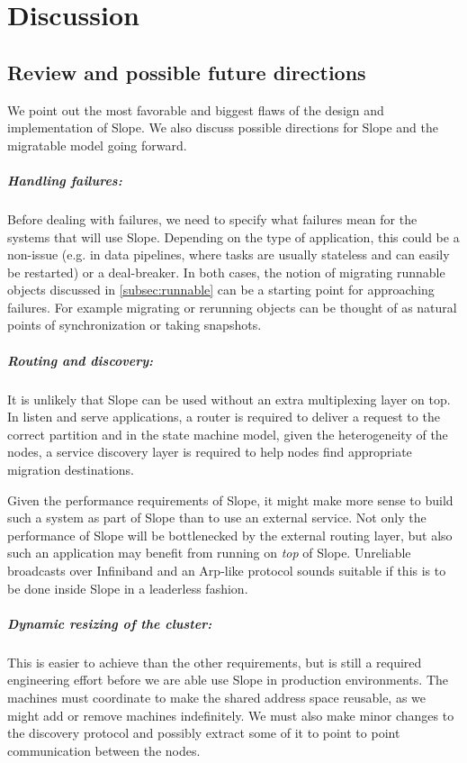 \chapter{Discussion}
\label{chap:discussionfuture}

\section{Review and possible future directions}
We point out the most favorable and biggest flaws of the design and
implementation of Slope. We also discuss possible directions for Slope
and the migratable model going forward.

\paragraph{Handling failures:}
Before dealing with failures, we need to specify what failures mean for the
    systems that will use Slope. Depending on the type of application,
    this could be a non-issue (e.g. in data pipelines, where tasks are
    usually stateless and can easily be restarted) or a deal-breaker.
    In both cases, the notion of migrating runnable objects discussed in
    \autoref{subsec:runnable} can be a starting point for approaching failures.
    For example migrating or rerunning objects can be thought of as natural
    points of synchronization or taking snapshots.


\paragraph{Routing and discovery:}
It is unlikely that Slope can be used without an extra multiplexing
layer on top. In listen and serve applications, a router is required to deliver
a request to the correct partition and in the state machine model,
given the heterogeneity of the nodes, a service discovery layer is
required to help nodes find appropriate migration destinations.

Given the
performance requirements of Slope, it might make more sense to build such
a system as part of Slope than to use an external service. Not only the
performance of Slope will be bottlenecked by the external routing layer, but
also such an application may benefit from running on \emph{top} of Slope.
Unreliable broadcasts over Infiniband and an Arp-like protocol sounds suitable
if this is to be done inside Slope in a leaderless fashion.



\paragraph{Dynamic resizing of the cluster:}
This is easier to achieve than the other requirements, but is still a required
engineering effort before we are able use Slope in production environments.
The machines must coordinate to make the shared address space reusable, as we
might add or remove machines indefinitely. We must also make minor changes to
the discovery protocol and possibly extract some of it to point to point
communication between the nodes.




